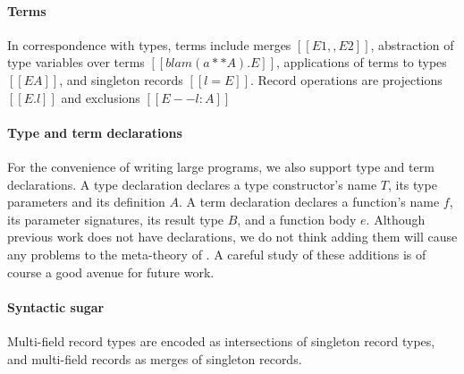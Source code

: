 \paragraph{Terms}

In correspondence with types, terms include merges $[[E1 ,, E2]]$, abstraction
of type variables over terms $[[blam ( a ** A ) . E]]$, applications of terms to
types $[[E A]]$, and singleton records $[[ { l = E } ]]$. Record operations are
projections $[[E.l]]$ and exclusions $[[E -- { l : A }]]$

\paragraph{Type and term declarations}

For the convenience of writing large programs, we also support type and term
declarations. A type declaration declares a type constructor's name $T$, its
type parameters and its definition $A$. A term declaration declares a function's
name $f$, its parameter signatures, its result type $B$, and a function body
$e$. Although previous work does not have declarations, we do not think adding
them will cause any problems to the meta-theory of \bname. A careful study of
these additions is of course a good avenue for future work.

\paragraph{Syntactic sugar} Multi-field record types are encoded as
intersections of singleton record types, and multi-field records as merges of
singleton records.


